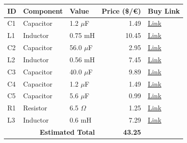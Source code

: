 \begin{table}[H]
    \centering
    \renewcommand{\arraystretch}{1.5}
    \begin{tabular}{@{}lllrl@{}}
        \toprule
        \textbf{ID} & \textbf{Component} & \textbf{Value} & \textbf{Price (\$/€)} & \textbf{Buy Link} \\
        \midrule
        C1 & Capacitor & 1.2 $\mu$F & 1.49 & \href{https://www.soundimports.eu/en/jantzen-audio-001-0234.html}{Link} \\
        L1 & Inductor & 0.75 mH & 10.45 & \href{https://www.soundimports.eu/en/jantzen-audio-000-1075.html}{Link} \\
        C2 & Capacitor & 56.0 $\mu$F & 2.95 & \href{https://www.soundimports.eu/en/jantzen-audio-001-6162.html}{Link} \\
        L2 & Inductor & 0.56 mH & 7.45 & \href{https://www.soundimports.eu/en/jantzen-audio-000-2377.html}{Link} \\
        C3 & Capacitor & 40.0 $\mu$F & 9.89 & \href{https://www.parts-express.com/Dayton-Audio-PMPC-40-40uF-250V-Precision-Audio-Capacitor-027-260}{Link} \\
        C4 & Capacitor & 1.2 $\mu$F & 1.49 & \href{https://www.soundimports.eu/en/jantzen-audio-001-0234.html}{Link} \\
        C5 & Capacitor & 5.6 $\mu$F & 0.99 & \href{https://www.parts-express.com/5.6uF-100V-Non-Polarized-Capacitor-027-334}{Link} \\
        R1 & Resistor & 6.5 $\Omega$ & 1.25 & \href{https://www.parts-express.com/Dayton-Audio-DNR-6.5-6.5-Ohm-10W-Precision-Audio-Grade-Resis-004-6.5}{Link} \\
        L3 & Inductor & 0.6 mH & 7.29 & \href{https://www.parts-express.com/Jantzen-1951-0.60mH-18-AWG-Air-Core-Inductor-255-234}{Link} \\
        \midrule
        \multicolumn{3}{r}{\textbf{Estimated Total}} & \textbf{43.25} & \\
        \bottomrule
    \end{tabular}
\end{table}
